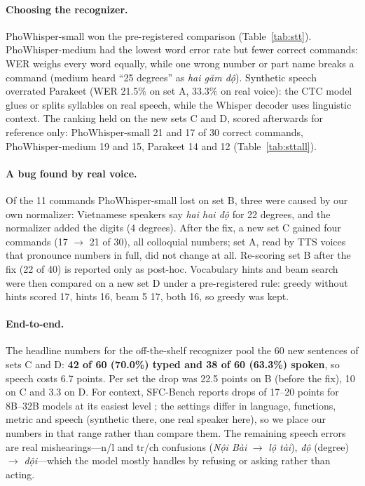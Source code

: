 \paragraph{Choosing the recognizer.} PhoWhisper-small won the pre-registered comparison (Table~\ref{tab:stt}).
PhoWhisper-medium had the lowest word error rate but fewer correct commands: WER weighs every word equally, while one wrong
number or part name breaks a command (medium heard ``25 degrees'' as \textit{hai găm độ}). Synthetic speech overrated
Parakeet (WER 21.5\% on set A, 33.3\% on real voice): the CTC model glues or splits syllables on real speech, while the
Whisper decoder uses linguistic context. The ranking held on the new sets C and D, scored afterwards for reference only:
PhoWhisper-small 21 and 17 of 30 correct commands, PhoWhisper-medium 19 and 15, Parakeet 14 and 12
(Table~\ref{tab:sttall}).

\paragraph{A bug found by real voice.} Of the 11 commands PhoWhisper-small lost on set B, three were caused by our own
normalizer: Vietnamese speakers say \textit{hai hai độ} for 22 degrees, and the normalizer added the digits (4 degrees). After
the fix, a new set C gained four commands (17 $\rightarrow$ 21 of 30), all colloquial numbers; set A, read by TTS voices that
pronounce numbers in full, did not change at all. Re-scoring set B after the fix (22 of 40) is reported only as post-hoc.
Vocabulary hints and beam search were then compared on a new set D under a pre-registered rule: greedy without hints scored
17, hints 16, beam 5 17, both 16, so greedy was kept.

\paragraph{End-to-end.} The headline numbers for the off-the-shelf recognizer pool the 60 new sentences of sets C and D:
\textbf{42 of 60 (70.0\%) typed and 38 of 60 (63.3\%) spoken}, so speech costs 6.7 points. Per set the drop was 22.5 points on B (before the
fix), 10 on C and 3.3 on D. For context, SFC-Bench reports drops of 17--20 points for 8B--32B models at its easiest level
\citep{peng2026sfc}; the settings differ in language, functions, metric and speech (synthetic there, one real speaker here),
so we place our numbers in that range rather than compare them. The remaining speech errors are real mishearings---n/l and
tr/ch confusions (\textit{Nội Bài} $\rightarrow$ \textit{lộ tài}), \textit{độ} (degree) $\rightarrow$ \textit{đội}---which the
model mostly handles by refusing or asking rather than acting.

